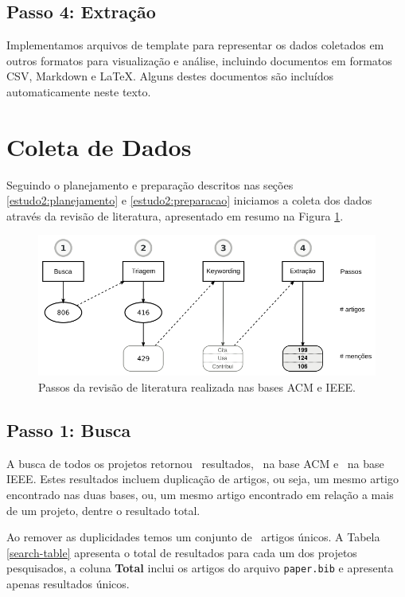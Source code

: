 \subsection{Passo 4: Extração}

Implementamos arquivos de template para representar os dados coletados em
outros formatos para visualização e análise, incluindo documentos em formatos
CSV, Markdown e \LaTeX. Alguns destes documentos são incluídos automaticamente
neste texto.


\section{Coleta de Dados} \label{estudo2:coleta} %

Seguindo o planejamento e preparação descritos nas seções
\ref{estudo2:planejamento} e \ref{estudo2:preparacao} iniciamos a coleta dos
dados através da revisão de literatura, apresentado em resumo na Figura \ref{estudo2-revisao-literatura}.

\begin{figure}[h]
  \center
  \includegraphics[scale=0.35]{imagens/estudo2-revisao-literatura.png}
  \caption{Passos da revisão de literatura realizada nas bases ACM e IEEE.}
  \label{estudo2-revisao-literatura}
\end{figure}


\subsection{Passo 1: Busca}

A busca de todos os projetos retornou \SearchCount \ resultados,
\SearchACMCount \ na base ACM e \SearchIEEECount \ na base IEEE.
Estes resultados incluem duplicação de artigos, ou seja,
um mesmo artigo encontrado nas duas bases, ou, um mesmo artigo
encontrado em relação a mais de um projeto, dentre o resultado total.

Ao remover as duplicidades temos um conjunto de \SearchUniqueCount \ artigos
únicos.  A Tabela \ref{search-table} apresenta o total de resultados para cada
um dos projetos pesquisados, a coluna {\bf Total} inclui os artigos do arquivo
\texttt{paper.bib} e apresenta apenas resultados únicos.

